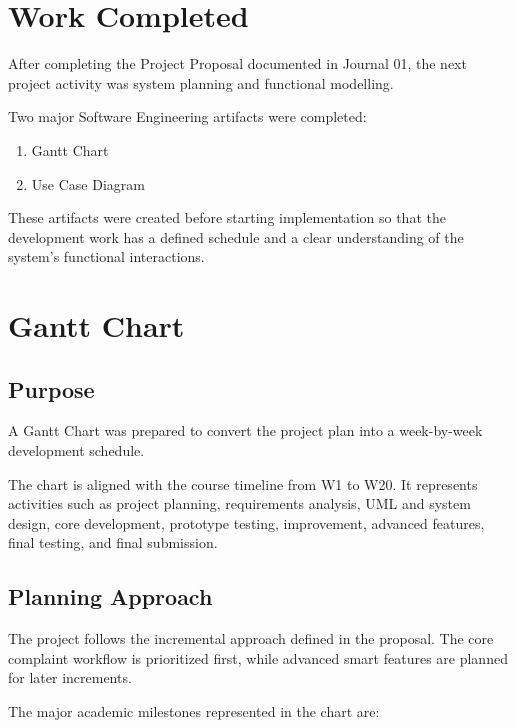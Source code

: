 \documentclass[12pt,a4paper]{article}
\begin{document}
\section{Work Completed}

After completing the Project Proposal documented in Journal 01, the next project activity was system planning and functional modelling.

Two major Software Engineering artifacts were completed:

\begin{enumerate}[leftmargin=*]
\item Gantt Chart
\item Use Case Diagram
\end{enumerate}

These artifacts were created before starting implementation so that the development work has a defined schedule and a clear understanding of the system's functional interactions.

\section{Gantt Chart}

\subsection{Purpose}

A Gantt Chart was prepared to convert the project plan into a week-by-week development schedule.

The chart is aligned with the course timeline from W1 to W20. It represents activities such as project planning, requirements analysis, UML and system design, core development, prototype testing, improvement, advanced features, final testing, and final submission.

\subsection{Planning Approach}

The project follows the incremental approach defined in the proposal. The core complaint workflow is prioritized first, while advanced smart features are planned for later increments.

The major academic milestones represented in the chart are:
\end{document}
